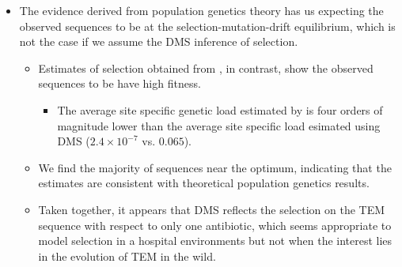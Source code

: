 \documentclass[12pt]{article}
\begin{document}
\begin{itemize}
	\item The evidence derived from population genetics theory has us expecting the observed sequences to be at the selection-mutation-drift equilibrium, which is not the case if we assume the DMS inference of selection.
	\begin{itemize}
		\item Estimates of selection obtained from \selac, in contrast, show the observed sequences to be have high fitness.
		\begin{itemize}
			\item The average site specific genetic load estimated by \selac is four orders of magnitude lower than the average site specific load esimated using DMS ($2.4\times10^{-7}$ vs. $0.065$).
		\end{itemize}
		\item We find the majority of sequences near the optimum, indicating that the \selac estimates are consistent with theoretical population genetics results.
		\item Taken together, it appears that DMS reflects the selection on the TEM sequence with respect to only one antibiotic, which seems appropriate to model selection in a hospital environments but not when the interest lies in the evolution of TEM in the wild.
	\end{itemize}
	

\end{itemize}
\end{document}
